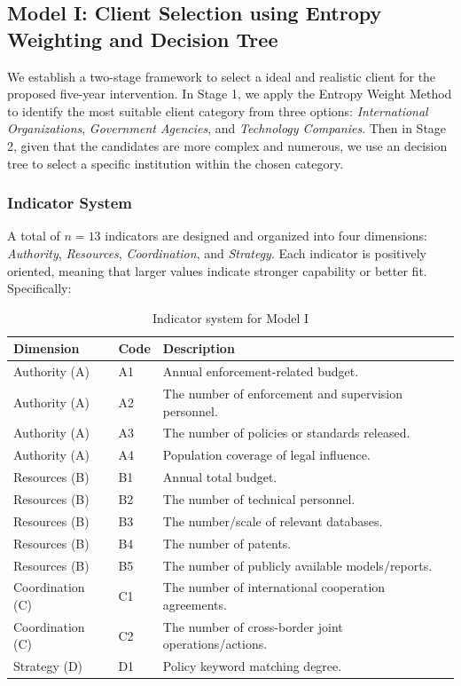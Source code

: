 \documentclass{mcmthesis}
\begin{document}
\subsection{Model I: Client Selection using Entropy Weighting and Decision Tree}

We establish a two-stage framework to select a ideal and realistic client for the proposed five-year intervention.
In Stage 1, we apply the Entropy Weight Method to identify the most suitable client category from three options: \textit{International Organizations}, \textit{Government Agencies}, and \textit{Technology Companies}.
 Then in Stage 2, given that the candidates are more complex and numerous, we use an decision tree to select a specific institution within the chosen category.

\subsubsection{Indicator System}

A total of $n=13$ indicators are designed and organized into four dimensions: \textit{Authority}, \textit{Resources}, \textit{Coordination}, and \textit{Strategy}. Each indicator is positively oriented, meaning that larger values indicate stronger capability or better fit. Specifically:
\begin{table}[!htbp]
\centering
\caption{Indicator system for Model I}
\renewcommand{\arraystretch}{1.4} %
\begin{tabular}{p{} p{} p{}}
\hline
\textbf{Dimension} & \textbf{Code} & \textbf{Description} \\
\hline
Authority (A) & A1 & Annual enforcement-related budget. \\
Authority (A) & A2 & The number of enforcement and supervision personnel. \\
Authority (A) & A3 & The number of policies or standards released. \\
Authority (A) & A4 & Population coverage of legal influence. \\
\hline
Resources (B) & B1 & Annual total budget. \\
Resources (B) & B2 & The number of technical personnel. \\
Resources (B) & B3 & The number/scale of relevant databases. \\
Resources (B) & B4 & The number of patents. \\
Resources (B) & B5 & The number of publicly available models/reports. \\
\hline
Coordination (C) & C1 & The number of international cooperation agreements. \\
Coordination (C) & C2 & The number of cross-border joint operations/actions. \\
\hline
Strategy (D) & D1 & Policy keyword matching degree. \\
\hline
\end{tabular}
\renewcommand{\arraystretch}{1.0}
\end{table}
\end{document}
